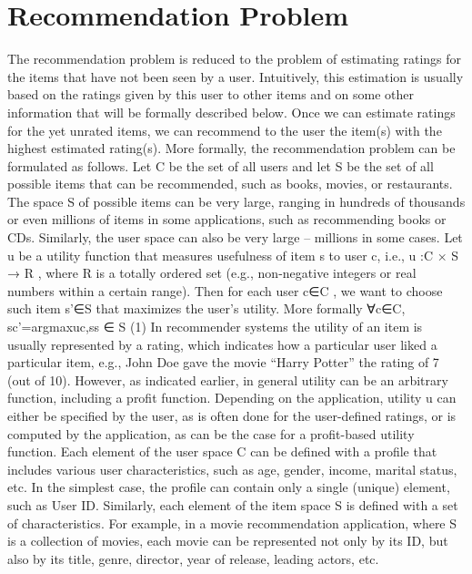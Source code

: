 \section{Recommendation Problem}
The recommendation problem is reduced to the problem of estimating ratings for the items that have not been seen by a user. Intuitively, this estimation is usually based on the ratings given by this user to other items and on some other information that will be formally described below. Once we can estimate ratings for the yet unrated items, we can recommend to the user the item(s) with the highest estimated rating(s).
More formally, the recommendation problem can be formulated as follows. Let C be the set of all users and let S be the set of all possible items that can be recommended, such as books, movies, or restaurants. The space S of possible items can be very large, ranging in hundreds of thousands or even millions of items in some applications, such as recommending books or CDs.
Similarly, the user space can also be very large – millions in some cases. Let u be a utility function that measures usefulness of item s to user c, i.e., u :C × S → R , where R is a totally ordered set (e.g., non-negative integers or real numbers within a certain range). Then for each user c∈C , we want to choose such item s'∈S that maximizes the user’s utility. More formally
∀c∈C,  sc'=argmaxuc,ss ∈ S              (1)
In recommender systems the utility of an item is usually represented by a rating, which indicates how a particular user liked a particular item, e.g., John Doe gave the movie “Harry Potter” the rating of 7 (out of 10). However, as indicated earlier, in general utility can be an arbitrary function, including a profit function. Depending on the application, utility u can either be specified by the user, as is often done for the user-defined ratings, or is computed by the application, as can be the case for a profit-based utility function.
Each element of the user space C can be defined with a profile that includes various user characteristics, such as age, gender, income, marital status, etc. In the simplest case, the profile can contain only a single (unique) element, such as User ID. Similarly, each element of the item space S is defined with a set of characteristics. For example, in a movie  recommendation application, where S is a collection of movies, each movie can be represented not only by its ID, but also by its title, genre, director, year of release, leading actors, etc.
